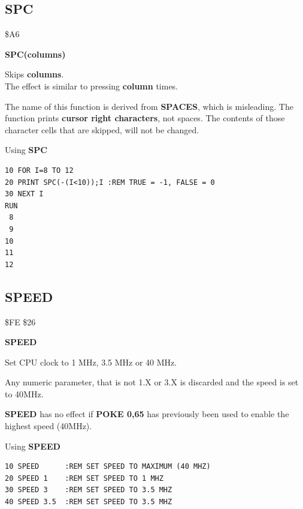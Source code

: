
\newpage
\subsection{SPC}
\begin{description}[leftmargin=2cm,style=nextline]
\item [Token:] \$A6
\item [Format:] {\bf SPC(columns)}
\item [Usage:] Skips {\bf columns}. \\
               The effect is similar to pressing \megakey{$\rightarrow$}
               {\bf column} times.

\item [Remarks:] The name of this function is derived from
                 {\bf SPACES}, which is misleading.
                 The function prints {\bf cursor right characters},
                 not spaces. The contents of those character
                 cells that are skipped, will not be changed.

\item [Example:] Using {\bf SPC}
\begin{tcolorbox}[colback=black,coltext=white]
\verbatimfont{\codefont}
\begin{verbatim}
10 FOR I=8 TO 12
20 PRINT SPC(-(I<10));I :REM TRUE = -1, FALSE = 0
30 NEXT I
RUN
 8
 9
10
11
12
\end{verbatim}
\end{tcolorbox}
\end{description}


\newpage
\subsection{SPEED}
\begin{description}[leftmargin=2cm,style=nextline]
\item [Token:] \$FE \$26
\item [Format:] {\bf SPEED}
\item [Usage:] Set CPU clock to 1 MHz, 3.5 MHz or 40 MHz.
\item [Remarks:] Any numeric parameter, that is not 1.X or 3.X
                 is discarded and the speed is set to 40MHz.

                {\bf SPEED} has no effect if {\bf POKE 0,65}
                has previously been used to enable the highest speed (40MHz).

\item [Example:] Using {\bf SPEED}
\begin{tcolorbox}[colback=black,coltext=white]
\verbatimfont{\codefont}
\begin{verbatim}
10 SPEED      :REM SET SPEED TO MAXIMUM (40 MHZ)
20 SPEED 1    :REM SET SPEED TO 1 MHZ
30 SPEED 3    :REM SET SPEED TO 3.5 MHZ
40 SPEED 3.5  :REM SET SPEED TO 3.5 MHZ
\end{verbatim}
\end{tcolorbox}
\end{description}


